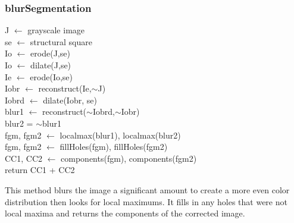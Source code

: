 \documentclass[12pt]{article}
\begin{document}
\subsubsection*{blurSegmentation}
\begin{addmargin}[12em]{1em}
	J $\leftarrow$ grayscale image \\
	se $\leftarrow$ structural square \\
	Io $\leftarrow$ erode(J,se) \\
	Io $\leftarrow$ dilate(J,se) \\
	Ie $\leftarrow$ erode(Io,se) \\
	Iobr $\leftarrow$ reconstruct(Ie,$\sim$J) \\
	Iobrd $\leftarrow$ dilate(Iobr, se) \\
	blur1 $\leftarrow$ reconstruct($\sim$Iobrd,$\sim$Iobr) \\
	blur2 = $\sim$blur1 \\
	fgm, fgm2 $\leftarrow$ localmax(blur1), localmax(blur2) \\
	fgm, fgm2 $\leftarrow$ fillHoles(fgm), fillHoles(fgm2) \\
	CC1, CC2 $\leftarrow$ components(fgm), components(fgm2) \\
	return CC1 + CC2 \\
\end{addmargin}
This method blurs the image a significant amount to create a more even color distribution then looks for local maximums. It fills in any holes that were not local maxima and returns the components of the corrected image.
\end{document}
